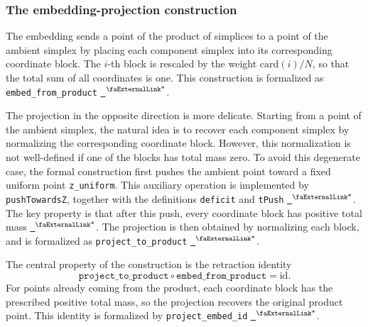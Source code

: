 \documentclass{article}
\theoremstyle{definition}
\newcommand{\extlink}{~\ensuremath{{}^\text{\faExternalLink*}}}
\begin{document}
\subsubsection{The embedding-projection construction}

The embedding sends a point of the product of simplices to a point of the ambient simplex by placing each component simplex into its corresponding coordinate block. The $i$-th block is rescaled by the weight $\mathrm{card}(i)/N$, so that the total sum of all coordinates is one. This construction is formalized as \texttt{embed\_from\_product}
\href{https://github.com/Solo-ary/Game-Theory-Formalization/blob/7b49d5267d4f26b17bdf071250880b63e96999b6/Brouwer/Gametheory/Brouwer_product.lean#L374-L411}{\extlink}.

The projection in the opposite direction is more delicate. Starting from a point of the ambient simplex, the natural idea is to recover each component simplex by normalizing the corresponding coordinate block. However, this normalization is not well-defined if one of the blocks has total mass zero. To avoid this degenerate case, the formal construction first pushes the ambient point toward a fixed uniform point \texttt{z\_uniform}. This auxiliary operation is implemented by \texttt{pushTowardsZ}, together with the definitions \texttt{deficit} and \texttt{tPush}
\href{https://github.com/Solo-ary/Game-Theory-Formalization/blob/7b49d5267d4f26b17bdf071250880b63e96999b6/Brouwer/Gametheory/Brouwer_product.lean#L223-L292}{\extlink}.
The key property is that after this push, every coordinate block has positive total mass
\href{https://github.com/Solo-ary/Game-Theory-Formalization/blob/7b49d5267d4f26b17bdf071250880b63e96999b6/Brouwer/Gametheory/Brouwer_product.lean#L525-L558}{\extlink}.
The projection is then obtained by normalizing each block, and is formalized as \texttt{project\_to\_product}
\href{https://github.com/Solo-ary/Game-Theory-Formalization/blob/7b49d5267d4f26b17bdf071250880b63e96999b6/Brouwer/Gametheory/Brouwer_product.lean#L294-L372}{\extlink}.

The central property of the construction is the retraction identity
$$
\texttt{project\_to\_product}\circ \texttt{embed\_from\_product}
=
\mathrm{id}.
$$
For points already coming from the product, each coordinate block has the prescribed positive total mass, so the projection recovers the original product point. This identity is formalized by \texttt{project\_embed\_id}
\href{https://github.com/Solo-ary/Game-Theory-Formalization/blob/7b49d5267d4f26b17bdf071250880b63e96999b6/Brouwer/Gametheory/Brouwer_product.lean#L413-L486}{\extlink}.
\end{document}
